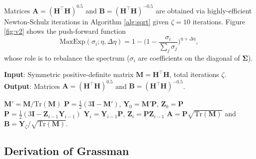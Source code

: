 \vspace{0.1cm}
\noindent Matrices $\mathbf{A}=(\mathbf{H}^\top\mathbf{H})^{0.5}$ and $\mathbf{B}=(\mathbf{H}^\top\mathbf{H})^{-0.5}$ are obtained via highly-efficient Newton-Schulz iterations 
in Algorithm \ref{alg:sqrt} given $\zeta=10$ iterations. Figure \ref{fig:v2} shows the push-forward function 
%
\begin{equation}\text{MaxExp}(\sigma_i; \eta, \Delta\eta)=1-\Big(1-\frac{\sigma_i}{\sum_j\sigma_j}\Big)^{\eta+\Delta\eta},\end{equation} 
%
whose role is to rebalance the spectrum ($\sigma_i$ are coefficients on the diagonal of $\mathbf{\Sigma}$).

\begin{algorithm}[h]
\caption{Newton-Schulz iterations.}
\label{alg:sqrt}
\textbf{Input}: Symmetric positive-definite matrix $\mathbf{M}=\mathbf{H}^\top\mathbf{H}$, total iterations $\zeta$.\\
\textbf{Output}: Matrices $\mathbf{A}=(\mathbf{H}^\top\mathbf{H})^{0.5}$ and $\mathbf{B}=(\mathbf{H}^\top\mathbf{H})^{-0.5}$.

\begin{algorithmic}[1] %
\STATE $\mathbf{M}'=\mathbf{M}/\text{Tr}(\mathbf{M})$
\STATE $\mathbf{P} = \frac{1}{2}(3\mathbf{I}-\mathbf{M}')$, $\mathbf{Y}_0 = \mathbf{M}'\mathbf{P}$, $\mathbf{Z}_0 = \mathbf{P}$
    \STATE $\mathbf{P} = \frac{1}{2}(3\mathbf{I}-\mathbf{Z}_{i-1}\mathbf{Y}_{i-1})$\;
    \STATE $\mathbf{Y}_i = \mathbf{Y}_{i-1}\mathbf{P}$, $\mathbf{Z}_i = \mathbf{P}\mathbf{Z}_{i-1}$\;
\ENDFOR
\STATE $\mathbf{A} = \mathbf{P}\sqrt{\mathrm{Tr}(\mathbf{M})}$ and $\mathbf{B} = \mathbf{Y}_\zeta/\sqrt{\mathrm{Tr}(\mathbf{M})}$. %
\end{algorithmic}
\end{algorithm}


\subsection{Derivation of Grassman}
\label{sec:grass}

